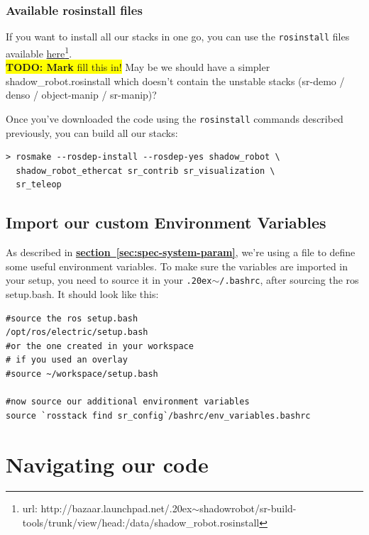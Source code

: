 \documentclass[12pt]{article}
\newcommand{\todo}[1]{\colorbox{yellow}{\textbf{TODO: #1} fill this in!}}
\newcommand{\linuxtilde}{\raise.20ex\hbox{$\scriptstyle\mathtt{\sim}$}}
\newcommand{\link}[1]{\hyperref[sec:#1]{\textbf{section~\ref*{sec:#1}}}}
\begin{document}
\subsubsection{Available rosinstall files}
\par If you want to install all our stacks in one go, you can use the \texttt{rosinstall} files available \href{http://bazaar.launchpad.net/~shadowrobot/sr-build-tools/trunk/view/head:/data/shadow_robot.rosinstall}{here}\footnote{url: http://bazaar.launchpad.net/\linuxtilde shadowrobot/sr-build-tools/trunk/view/head:/data/shadow\_robot.rosinstall}.\\

\todo{Mark} May be we should have a simpler shadow\_robot.rosinstall which doesn't contain the unstable stacks (sr-demo / denso / object-manip / sr-manip)?\\

\par Once you've downloaded the code using the \texttt{rosinstall} commands described previously, you can build all our stacks:
  \begin{lstlisting}[escapeinside='']
> rosmake --rosdep-install --rosdep-yes shadow_robot \
  shadow_robot_ethercat sr_contrib sr_visualization \
  sr_teleop
  \end{lstlisting}

\subsection{Import our custom Environment Variables}
\label{sec:import-vars}
\par As described in \link{spec-system-param}, we're using a file to define some useful environment variables. To make sure the variables are imported in your setup, you need to source it in your \texttt{\linuxtilde/.bashrc}, after sourcing the ros setup.bash. It should look like this:
  \begin{lstlisting}[title={\textbf{\linuxtilde/.bashrc}}, upquote=true]
#source the ros setup.bash
/opt/ros/electric/setup.bash
#or the one created in your workspace
# if you used an overlay
#source ~/workspace/setup.bash

#now source our additional environment variables
source `rosstack find sr_config`/bashrc/env_variables.bashrc
  \end{lstlisting}

\newpage

\section{Navigating our code}
\label{sec:navigate}
\end{document}

